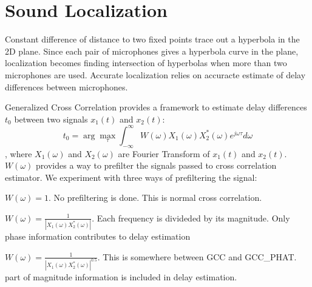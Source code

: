 \section{Sound Localization}
Constant difference of distance to two fixed points trace out a hyperbola in the 2D plane. Since each pair of microphones gives a hyperbola curve in the plane, localization becomes finding intersection of hyperbolas when more than two microphones are used. Accurate localization relies on accuracte estimate of delay differences between microphones.

Generalized Cross Correlation provides a framework to estimate delay differences $t_0$ between two signals $x_1(t)$ and $x_2(t)$:
\[
t_0 = \arg\max_{\tau} \int_{-\infty}^\infty W(\omega) X_1(\omega) X_2^{*}(\omega) e^{j\omega\tau} d\omega
\]
, where $X_1(\omega)$ and $X_2(\omega)$ are Fourier Transform of $x_1(t)$ and $x_2(t)$. $W(\omega)$ provides a way to prefilter the signals passed to cross correlation estimator. We experiment with three ways of prefiltering the signal:
\begin{description}
\item[GCC] $W(\omega) = 1$. No prefiltering is done. This is normal cross correlation.
\item[GCC\_PHAT] $W(\omega) = \frac{1}{\left|X_1(\omega)X_2^{*}(\omega)\right|}$. Each frequency is divideded by its magnitude. Only phase information contributes to delay estimation
\item[GCC\_PHAT\_SQRT] $W(\omega) = \frac{1}{\left|X_1(\omega)X_2^*(\omega)\right|^{0.5}}$. This is somewhere between GCC and GCC\_PHAT. part of magnitude information is included in delay estimation.
\end{description}
